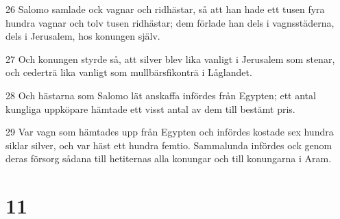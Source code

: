 \par 26 Salomo samlade ock vagnar och ridhästar, så att han hade ett tusen fyra hundra vagnar och tolv tusen ridhästar; dem förlade han dels i vagnsstäderna, dels i Jerusalem, hos konungen själv.
\par 27 Och konungen styrde så, att silver blev lika vanligt i Jerusalem som stenar, och cederträ lika vanligt som mullbärsfikonträ i Låglandet.
\par 28 Och hästarna som Salomo lät anskaffa infördes från Egypten; ett antal kungliga uppköpare hämtade ett visst antal av dem till bestämt pris.
\par 29 Var vagn som hämtades upp från Egypten och infördes kostade sex hundra siklar silver, och var häst ett hundra femtio. Sammalunda infördes ock genom deras försorg sådana till hetiternas alla konungar och till konungarna i Aram.

\chapter{11}


